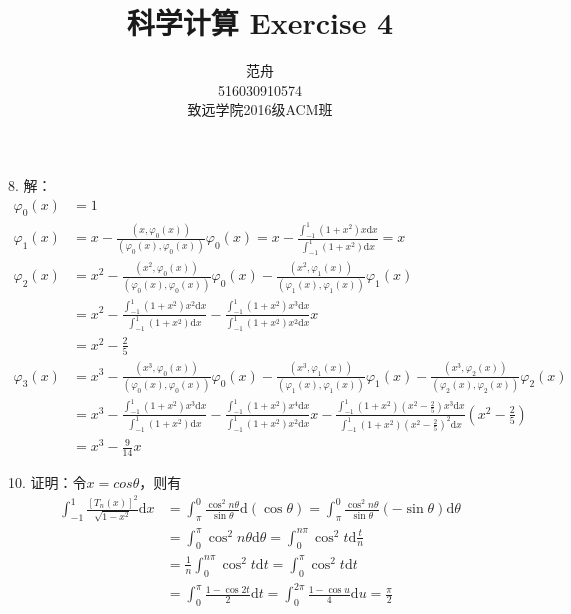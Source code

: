 \documentclass[12pt, a4paper]{article}
\title{科学计算 Exercise 4}
\author{范舟\\516030910574\\致远学院2016级ACM班}
\date{}
\theoremstyle{margin}
\begin{document}
\maketitle

8. 解：
\[\begin{split}
\varphi_0(x)&=1 \\
\varphi_1(x)&=x-\frac{(x,\varphi_0(x))}{(\varphi_0(x),\varphi_0(x))}\varphi_0(x)=x-\frac{\int_{-1}^{1}(1+x^2)x\mathrm{d}x}{\int_{-1}^{1}(1+x^2)\mathrm{d}x}=x \\
\varphi_2(x)&=x^2-\frac{(x^2,\varphi_0(x))}{(\varphi_0(x),\varphi_0(x))}\varphi_0(x)-\frac{(x^2,\varphi_1(x))}{(\varphi_1(x),\varphi_1(x))}\varphi_1(x) \\
&=x^2-\frac{\int_{-1}^{1}(1+x^2)x^2\mathrm{d}x}{\int_{-1}^{1}(1+x^2)\mathrm{d}x}-\frac{\int_{-1}^{1}(1+x^2)x^3\mathrm{d}x}{\int_{-1}^{1}(1+x^2)x^2\mathrm{d}x}x \\
&=x^2-\frac{2}{5} \\
\varphi_3(x)&=x^3-\frac{(x^3,\varphi_0(x))}{(\varphi_0(x),\varphi_0(x))}\varphi_0(x)-\frac{(x^3,\varphi_1(x))}{(\varphi_1(x),\varphi_1(x))}\varphi_1(x)-\frac{(x^3,\varphi_2(x))}{(\varphi_2(x),\varphi_2(x))}\varphi_2(x) \\
&=x^3-\frac{\int_{-1}^{1}(1+x^2)x^3\mathrm{d}x}{\int_{-1}^{1}(1+x^2)\mathrm{d}x}-\frac{\int_{-1}^{1}(1+x^2)x^4\mathrm{d}x}{\int_{-1}^{1}(1+x^2)x^2\mathrm{d}x}x-\frac{\int_{-1}^{1}(1+x^2)(x^2-\frac{2}{5})x^3\mathrm{d}x}{\int_{-1}^{1}(1+x^2)(x^2-\frac{2}{5})^2\mathrm{d}x}(x^2-\frac{2}{5})  \\
&=x^3-\frac{9}{14}x
\end{split}\]
\newline

10. 证明：令$x=cos\theta$，则有
\[\begin{split}
\int_{-1}^{1}\frac{[T_n(x)]^2}{\sqrt{1-x^2}}\mathrm{d}x&=\int_{\pi}^{0}\frac{\cos^2 n\theta}{\sin\theta}\mathrm{d}(\cos\theta)=\int_{\pi}^{0}\frac{\cos^2 n\theta}{\sin\theta}(-\sin \theta)\mathrm{d}\theta \\
&=\int_{0}^{\pi}\cos^2 n\theta\mathrm{d}\theta=\int_{0}^{n\pi}\cos^2 t\mathrm{d}\frac{t}{n} \\
&=\frac{1}{n}\int_{0}^{n\pi}\cos^2 t\mathrm{d}t=\int_{0}^{\pi}\cos^2 t\mathrm{d}t \\
&=\int_{0}^{\pi}\frac{1-\cos 2t}{2}\mathrm{d}t=\int_{0}^{2\pi}\frac{1-\cos u}{4}\mathrm{d}u=\frac{\pi}{2}
\end{split}\]
\newline
\end{document}
